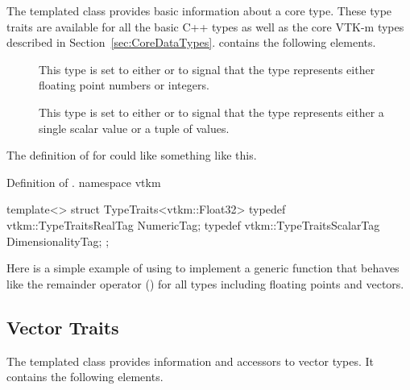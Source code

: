 The  templated class provides basic information
about a core type. These type traits are available for all the basic C++
types as well as the core VTK-m types described in
Section~\ref{sec:CoreDataTypes}.  contains the following
elements.


\begin{description}
\item[]  
  This type is set to either  or
   to signal that the type represents either
  floating point numbers or integers.
\item[] 
   This type is set to either
   or  to signal that
  the type represents either a single scalar value or a tuple of values.
\end{description}

The definition of  for  could like something
like this.
\begin{vtkmexample}{Definition of \protect {}.}
namespace vtkm {

template<>
struct TypeTraits<vtkm::Float32>
{
  typedef vtkm::TypeTraitsRealTag NumericTag;
  typedef vtkm::TypeTraitsScalarTag DimensionalityTag;
};

}
\end{vtkmexample}

Here is a simple example of using  to implement a generic
function that behaves like the remainder operator (\textcode{\%}) for all
types including floating points and vectors.




\subsection{Vector Traits}

The  templated class provides information and
accessors to vector types. It contains the following elements.


